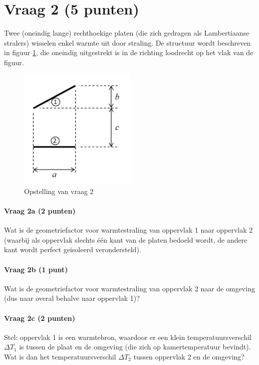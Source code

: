 \documentclass[a4paper]{article}
\begin{document}
\section*{Vraag 2 (5 punten)}
Twee (oneindig lange) rechthoekige platen (die zich gedragen als Lambertiaanse stralers) wisselen enkel warmte uit door straling. De structuur wordt beschreven in figuur \ref{fig:vraag2}, die oneindig uitgestrekt is in de richting loodrecht op het vlak van de figuur.

\begin{figure}[ht]
    \centering
    \includegraphics[width=0.5\textwidth]{vraag2}
    \caption{Opstelling van vraag 2}
    \label{fig:vraag2}
\end{figure}

\paragraph{Vraag 2a (2 punten)}
Wat is de geometriefactor voor warmtestraling van oppervlak 1 naar oppervlak 2 (waarbij als oppervlak slechts één kant van de platen bedoeld wordt, de andere kant wordt perfect geïsoleerd verondersteld).

\paragraph{Vraag 2b (1 punt)}
Wat is de geometriefactor voor warmtestraling van oppervlak 2 naar de omgeving (dus naar overal behalve naar oppervlak 1)?

\paragraph{Vraag 2c (2 punten)}
Stel: oppervlak 1 is een warmtebron, waardoor er een klein temperatuursverschil $\Delta T_1$ is tussen de plaat en de omgeving (die zich op kamertemperatuur bevindt).
Wat is dan het temperatuursverschil $\Delta T_2$ tussen oppervlak 2 en de omgeving?
\end{document}
